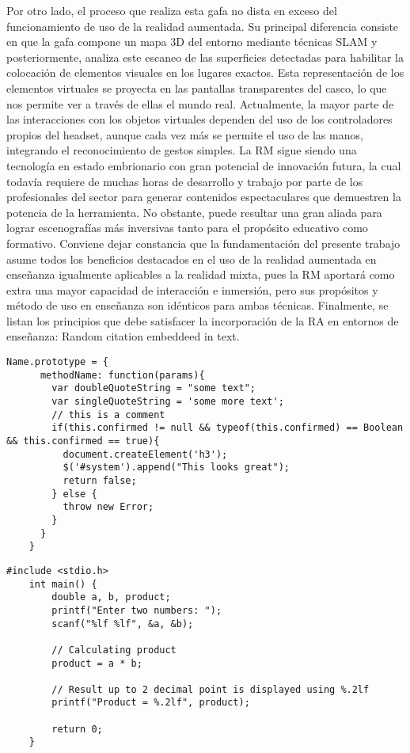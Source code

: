 Por otro lado, el proceso que realiza esta gafa no dista en exceso del funcionamiento de uso de la realidad aumentada. Su principal diferencia consiste en que la gafa compone un mapa 3D del entorno mediante técnicas SLAM y posteriormente, analiza este escaneo de las superficies detectadas para habilitar la colocación de elementos visuales en los lugares exactos. Esta representación de los elementos virtuales se proyecta en las pantallas transparentes del casco, lo que nos permite ver a través de ellas el mundo real. Actualmente, la mayor parte de las interacciones con los objetos virtuales dependen del uso de los controladores propios del headset, aunque cada vez más se permite el uso de las manos, integrando el reconocimiento de gestos simples.
La RM sigue siendo una tecnología en estado embrionario con gran potencial de innovación futura, la cual todavía requiere de muchas horas de desarrollo y trabajo por parte de los profesionales del sector para generar contenidos espectaculares que demuestren la potencia de la herramienta. No obstante, puede resultar una gran aliada para lograr escenografías más inversivas tanto para el propósito educativo como formativo.
Conviene dejar constancia que la fundamentación del presente trabajo asume todos los beneficios destacados en el uso de la realidad aumentada en enseñanza igualmente aplicables a la realidad mixta, pues la RM aportará como extra una mayor capacidad de interacción e inmersión, pero sus propósitos y método de uso en enseñanza son idénticos para ambas técnicas. Finalmente, se listan los principios que debe satisfacer la incorporación de la RA en entornos de enseñanza:
Random citation \autocite[1]{DUMMY1} embeddeed in text.



\begin{lstlisting}[caption=My Javascript Example]
    Name.prototype = {
      methodName: function(params){
        var doubleQuoteString = "some text";
        var singleQuoteString = 'some more text';
        // this is a comment
        if(this.confirmed != null && typeof(this.confirmed) == Boolean && this.confirmed == true){
          document.createElement('h3');
          $('#system').append("This looks great");
          return false;
        } else {
          throw new Error;
        }
      }
    }
\end{lstlisting}

\begin{lstlisting}[caption=My Javascript Example]
    #include <stdio.h>
    int main() {
        double a, b, product;
        printf("Enter two numbers: ");
        scanf("%lf %lf", &a, &b);  
     
        // Calculating product
        product = a * b;
    
        // Result up to 2 decimal point is displayed using %.2lf
        printf("Product = %.2lf", product);
        
        return 0;
    }
\end{lstlisting}

